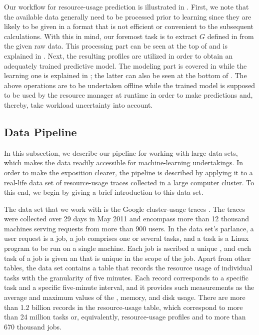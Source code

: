 Our workflow for resource-usage prediction is illustrated in
. First, we note that the available data generally need to
be processed prior to learning since they are likely to be given in a format
that is not efficient or convenient to the subsequent calculations. With this in
mind, our foremost task is to extract $G$ defined in  from
the given raw data. This processing part can be seen at the top of
 and is explained in . Next, the
resulting profiles are utilized in order to obtain an adequately trained
predictive model. The modeling part is covered in 
while the learning one is explained in ; the
latter can also be seen at the bottom of . The above
operations are to be undertaken offline while the trained model is supposed to
be used by the resource manager at runtime in order to make predictions and,
thereby, take workload uncertainty into account.

\subsection{Data Pipeline}

In this subsection, we describe our pipeline for working with large data sets,
which makes the data readily accessible for machine-learning undertakings. In
order to make the exposition clearer, the pipeline is described by applying it
to a real-life data set of resource-usage traces collected in a large computer
cluster. To this end, we begin by giving a brief introduction to this data set.

The data set that we work with is the Google cluster-usage traces
\cite{reiss2011}. The traces were collected over 29 days in May 2011 and
encompass more than 12 thousand machines serving requests from more than 900
users. In the data set's parlance, a user request is a job, a job comprises one
or several tasks, and a task is a Linux program to be run on a single machine.
Each job is ascribed a unique , and each task of a job is given an
 that is unique in the scope of the job. Apart from other tables, the
data set contains a table that records the resource usage of individual tasks
with the granularity of five minutes. Each record corresponds to a specific task
and a specific five-minute interval, and it provides such measurements as the
average and maximum values of the , memory, and disk usage. There are
more than 1.2 billion records in the resource-usage table, which correspond to
more than 24 million tasks or, equivalently, resource-usage profiles and to more
than 670 thousand jobs.

